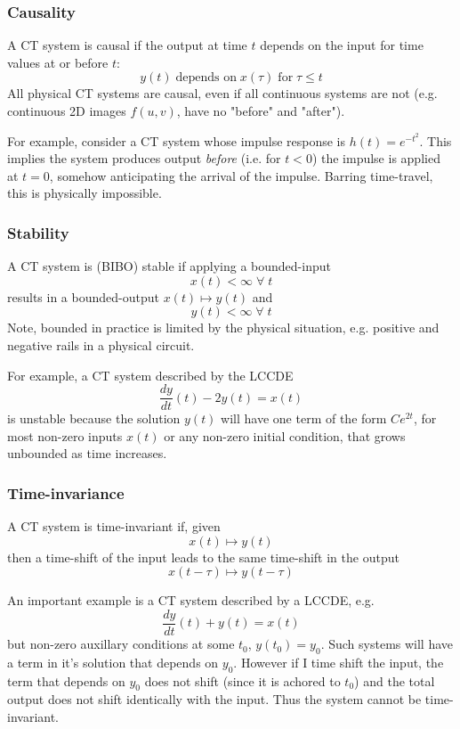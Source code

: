 \subsubsection{Causality}
A CT system is causal if the output at time $t$ depends on the input for time values at or before $t$:
\[
y(t) \;\text{depends on}\; x(\tau) \;\text{for} \; \tau \leq t
\]
All physical CT systems are causal, even if all continuous systems are not (e.g. continuous 2D images $f(u,v)$, have no "before" and "after").

For example, consider a CT system whose impulse response is $h(t) = e^{-t^2}$. This implies the system produces output \emph{before} (i.e. for $t < 0$) the impulse is applied at $t=0$, somehow anticipating the arrival of the impulse. Barring time-travel, this is physically impossible.

\subsubsection{Stability}

A CT system is (BIBO) stable if applying a bounded-input
\[
x(t) < \infty \; \forall \; t
\]
results in a bounded-output $x(t) \mapsto y(t)$ and 
\[
y(t) < \infty \; \forall \; t
\]
Note, bounded in practice is limited by the physical situation, e.g. positive and negative rails in a physical circuit.

For example, a CT system described by the LCCDE
\[
\frac{dy}{dt}(t) - 2y(t) = x(t)
\]
is unstable because the solution $y(t)$ will have one term of the form $Ce^{2t}$, for most non-zero inputs $x(t)$ or any non-zero initial condition, that grows unbounded as time increases.

\subsubsection{Time-invariance}
A CT system is time-invariant if, given
\[
x(t) \mapsto y(t)
\]
then a time-shift of the input leads to the same time-shift in the output
\[
x(t-\tau) \mapsto y(t-\tau)
\]

An important example is a CT system described by a LCCDE, e.g.
\[
\frac{dy}{dt}(t) + y(t) = x(t)
\]
but non-zero auxillary conditions at some $t_0$, $y(t_0) = y_0$. Such systems will have a term in it's solution that depends on $y_0$. However if I time shift the input, the term that depends on $y_0$ does not shift (since it is achored to $t_0$) and the total output does not shift identically with the input. Thus the system cannot be time-invariant.

